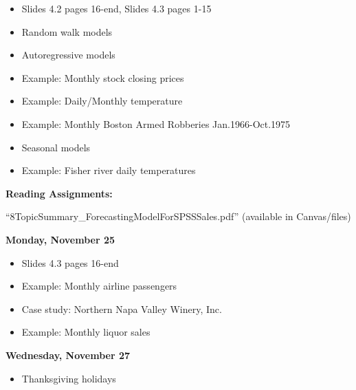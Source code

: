 \documentclass[11pt]{article}
\begin{document}
\begin{itemize}
\item  Slides 4.2 pages 16-end, Slides 4.3 pages 1-15

\item Random walk models

\item Autoregressive models
\item Example: Monthly stock closing prices
\item Example: Daily/Monthly temperature
\item Example: Monthly Boston Armed Robberies Jan.1966-Oct.1975

\item Seasonal models
\item Example: Fisher river daily temperatures 


\end{itemize}


\noindent\textbf{Reading Assignments:}

 ``8TopicSummary\_ForecastingModelForSPSSSales.pdf'' (available in Canvas/files)
 


\vspace{5mm}
\noindent\textbf{\large Monday, November 25} 	


\begin{itemize}
\item Slides 4.3 pages 16-end
\item Example: Monthly airline passengers
\item Case study: Northern Napa Valley Winery, Inc.
\item Example: Monthly liquor sales

\end{itemize}
	

\vspace{5mm}
\noindent\textbf{\large Wednesday, November 27}	
\begin{itemize}
\item 
Thanksgiving holidays 
\end{itemize}
\vspace{5mm}
\end{document}
